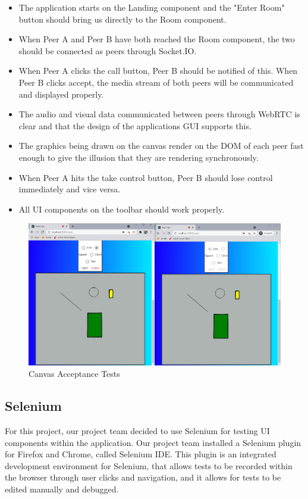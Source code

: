 \begin{itemize}
    \item The application starts on the Landing component and the "Enter Room" button should bring us directly to the Room component. 
    \item When Peer A and Peer B have both reached the Room component, the two should be connected as peers through Socket.IO. 
    \item When Peer A clicks the call button, Peer B should be notified of this. When Peer B clicks accept, the media stream of both peers will be communicated and displayed properly. 
    \item The audio and visual data communicated between peers through WebRTC is clear and that the design of the applications GUI supports this.
    \item The graphics being drawn on the canvas render on the DOM of each peer fast enough to give the illusion that they are rendering synchronously.       
    \item When Peer A hits the take control button, Peer B should lose control immediately and vice versa. 
    \item All UI components on the toolbar should work properly.
\end{itemize}

\begin{figure}[H]
    \centering
    \includegraphics[scale=0.3]{img/Evaluation/canvas-testing.JPG}
    \caption{Canvas Acceptance Tests}
    \label{canvas-acceptance}
\end{figure}

\subsection{Selenium}
\label{selenium}
For this project, our project team decided to use Selenium for testing UI components within the application. Our project team installed a Selenium plugin for Firefox and Chrome, called Selenium IDE. This plugin is an integrated development environment for Selenium, that allows tests to be recorded within the browser through user clicks and navigation, and it allows for tests to be edited manually and debugged. 


